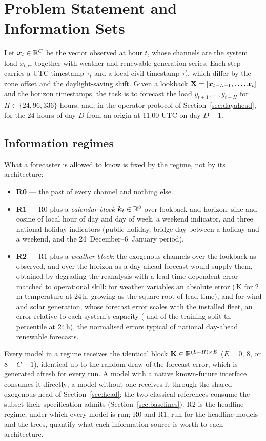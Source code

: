 \section{Problem Statement and Information Sets}
\label{sec:problem}
Let $\boldsymbol{x}_t\in\mathbb{R}^{C}$ be the vector observed at hour $t$, whose channels are the system load
$x_{t,c^\star}$ together with weather and renewable-generation series. Each step carries a UTC
timestamp $\tau_t$ and a local civil timestamp $\tau^{\ell}_t$, which differ by the zone offset
and the daylight-saving shift. Given a lookback $\mathbf{X}=[\boldsymbol{x}_{t-L+1},\dots,\boldsymbol{x}_t]$ and the
horizon timestamps, the task is to forecast the load $y_{t+1},\dots,y_{t+H}$ for
$H\in\{24,96,336\}$ hours, and, in the operator protocol of Section~\ref{sec:dayahead}, for
the 24 hours of day $D$ from an origin at 11:00 UTC on day $D-1$.

\subsection{Information regimes}
\label{sec:regimes}
What a forecaster is allowed to know is fixed by the regime, not by its architecture:
\begin{itemize}
\item \textbf{R0} --- the past of every channel and nothing else.
\item \textbf{R1} --- R0 plus a \emph{calendar block} $\boldsymbol{k}_t\in\mathbb{R}^{8}$ over lookback and
      horizon: sine and cosine of local hour of day and day of week, a weekend indicator, and
      three national-holiday indicators (public holiday, bridge day between a holiday and a
      weekend, and the 24~December--6~January period).
\item \textbf{R2} --- R1 plus a \emph{weather block}: the exogenous channels over the lookback
      as observed, and over the horizon as a day-ahead forecast would supply them, obtained by
      degrading the reanalysis with a lead-time-dependent error matched to operational skill:
      for weather variables an absolute error (\,K for 2\,m temperature
      at 24\,h, growing as the square root of lead time), and for wind and solar generation,
      whose forecast error scales with the installed fleet, an error relative to each system's
      capacity ( and  of the training-split
      th percentile at 24\,h), the normalised errors typical of national day-ahead
      renewable forecasts.
\end{itemize}
Every model in a regime receives the identical block $\mathbf{K}\in\mathbb{R}^{(L+H)\times E}$
($E=0$, $8$, or $8+C-1$), identical up to the random draw of the forecast error, which is
generated afresh for every run. A model with a native known-future interface consumes it
directly; a model without one receives it through the shared exogenous head of
Section~\ref{sec:head}; the two classical references consume the subset their specification
admits (Section~\ref{sec:baselines}). R2 is the headline regime, under which every model is
run; R0 and R1, run for the headline models and the trees, quantify what each information
source is worth to each architecture.

